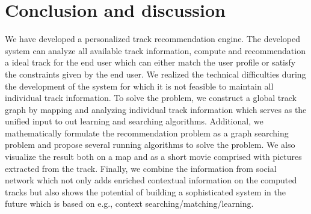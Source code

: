 
\section{Conclusion and discussion}

We have developed a personalized track recommendation engine.
The developed system can analyze all available track information, compute and recommendation a ideal track for the end user which can either match the user profile or satisfy the constraints given by the end user.
We realized the technical difficulties during the development of the system for which it is not feasible to maintain all individual track information.
To solve the problem, we construct a global track graph by mapping and analyzing individual track information which serves as the unified input to out learning and searching algorithms.
Additional, we mathematically formulate the recommendation problem as a graph searching problem and propose several running algorithms to solve the problem.
We also visualize the result both on a map and as a short movie comprised with pictures extracted from the track.
Finally, we combine the information from social network which not only adds enriched contextual information on the computed tracks but also shows the potential of building a sophisticated system in the future which is based on e.g., context searching/matching/learning. 
